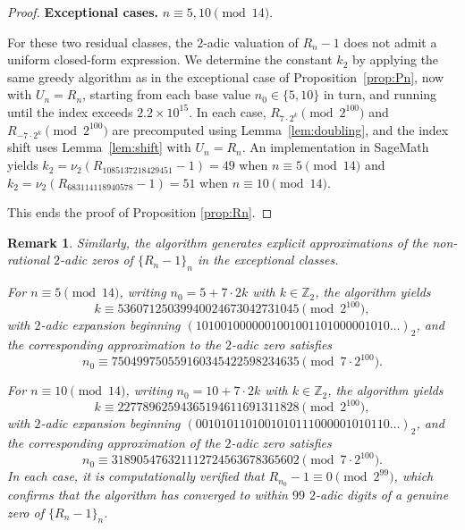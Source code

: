 \documentclass[11pt,a4paper]{article}
\newtheorem{remark}[theorem]{Remark}
\numberwithin{equation}{section}
\numberwithin{table}{section}
\numberwithin{figure}{section}
\begin{document}
\begin{proof}
	\medskip
	\noindent\textbf{Exceptional cases.} 
	$n\equiv 5,10\pmod{14}$.
	
For these two residual classes, the $2$-adic valuation of $R_n-1$ does not admit a uniform closed-form expression. We determine the constant $k_2$ by applying the same greedy algorithm as in the exceptional case of Proposition~\ref{prop:Pn}, now with $U_n=R_n$, starting from each base value $n_0\in\{5,10\}$ in turn, and running until the index exceeds $2.2\times 10^{15}$. In each case, $R_{7\cdot 2^k}\pmod{2^{100}}$ and $R_{-7\cdot 2^k}\pmod{2^{100}}$ are precomputed using Lemma~\ref{lem:doubling}, and the index shift uses Lemma~\ref{lem:shift} with $U_n=R_n$. An implementation in SageMath yields $k_2=\nu_{2}(R_{1085137218429451}-1)=49$ when $n\equiv 5\pmod{14}$ and $k_{2}=\nu_{2}(R_{683114118940578}-1)=51$ when $n\equiv 10\pmod{14}$. 

This ends the proof of Proposition \ref{prop:Rn}.
\end{proof}

\begin{remark}\label{rem:2adic-k-perrin}
Similarly, the algorithm generates explicit approximations of the non-rational $2$-adic zeros of $\{R_n-1\}_{n}$ in the exceptional classes. 
	
For $n\equiv 5\pmod{14}$, writing $n_0=5+7\cdot 2k$ with $k\in\mathbb{Z}_2$, the algorithm yields
	\begin{equation*}
		k \equiv 53607125039940024673042731045
		\pmod{2^{100}},
	\end{equation*}
with $2$-adic expansion beginning 
	$(1010010000001001001101000001010\ldots)_2$,
and the corresponding approximation to the $2$-adic zero satisfies
	\begin{equation*}
		n_0 \equiv 750499750559160345422598234635
		\pmod{7\cdot 2^{100}}.
	\end{equation*}
	
For $n\equiv 10\pmod{14}$, writing $n_0=10+7\cdot 2k$ with $k\in\mathbb{Z}_2$, the algorithm yields
	\begin{equation*}
		k \equiv 22778962594365194611691311828
		\pmod{2^{100}},
\end{equation*}
with $2$-adic expansion beginning $(0010101101001010111000001010110\ldots)_2$, and the corresponding approximation of the $2$-adic zero satisfies
	\begin{equation*}
		n_0 \equiv 318905476321112724563678365602
		\pmod{7\cdot 2^{ 100}}.
	\end{equation*}
In each case, it is computationally verified that $R_{n_0}-1\equiv 0\pmod{2^{99}}$, which confirms that the algorithm has converged to within $99$ $2$-adic digits of a genuine zero of $\{R_n-1\}_{n}$.
\end{remark}
\end{document}
